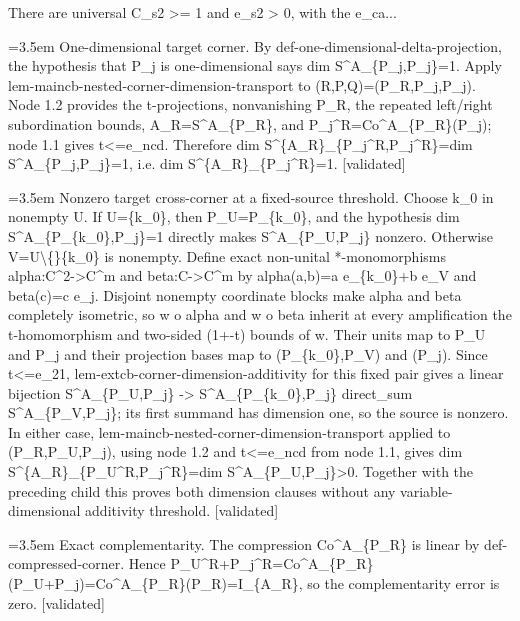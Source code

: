 \documentclass{article}
\newcommand{\step}[1]{\par\noindent\hangindent=3.5em\hangafter=1%
  \makebox[3.5em][l]{\textbf{#1.}}}
\newcommand{\steptag}[1]{\hfill{\small\textsf{[#1]}}}
\begin{document}
\begin{proofbox}{There are universal C\_s2 >= 1 and e\_s2 > 0, with the e\_ca...}
\step{1.5.1} One-dimensional target corner. By def-one-dimensional-delta-projection, the hypothesis that P\_j is one-dimensional says dim S\textasciicircum{}A\_\{P\_j,P\_j\}=1. Apply lem-maincb-nested-corner-dimension-transport to (R,P,Q)=(P\_R,P\_j,P\_j). Node 1.2 provides the t-projections, nonvanishing P\_R, the repeated left/right subordination bounds, A\_R=S\textasciicircum{}A\_\{P\_R\}, and P\_j\textasciicircum{}R=Co\textasciicircum{}A\_\{P\_R\}(P\_j); node 1.1 gives t<=e\_ncd. Therefore dim S\textasciicircum{}\{A\_R\}\_\{P\_j\textasciicircum{}R,P\_j\textasciicircum{}R\}=dim S\textasciicircum{}A\_\{P\_j,P\_j\}=1, i.e. dim S\textasciicircum{}\{A\_R\}\_\{P\_j\textasciicircum{}R\}=1. \steptag{validated} \\[4pt]
\step{1.5.2} Nonzero target cross-corner at a fixed-source threshold. Choose k\_0 in nonempty U. If U=\{k\_0\}, then P\_U=P\_\{k\_0\}, and the hypothesis dim S\textasciicircum{}A\_\{P\_\{k\_0\},P\_j\}=1 directly makes S\textasciicircum{}A\_\{P\_U,P\_j\} nonzero. Otherwise V=U\textbackslash\{\}\{k\_0\} is nonempty. Define exact non-unital *-monomorphisms alpha:C\textasciicircum{}2->C\textasciicircum{}m and beta:C->C\textasciicircum{}m by alpha(a,b)=a e\_\{k\_0\}+b e\_V and beta(c)=c e\_j. Disjoint nonempty coordinate blocks make alpha and beta completely isometric, so w o alpha and w o beta inherit at every amplification the t-homomorphism and two-sided (1+-t) bounds of w. Their units map to P\_U and P\_j and their projection bases map to (P\_\{k\_0\},P\_V) and (P\_j). Since t<=e\_21, lem-extcb-corner-dimension-additivity for this fixed pair gives a linear bijection S\textasciicircum{}A\_\{P\_U,P\_j\} -> S\textasciicircum{}A\_\{P\_\{k\_0\},P\_j\} direct\_sum S\textasciicircum{}A\_\{P\_V,P\_j\}; its first summand has dimension one, so the source is nonzero. In either case, lem-maincb-nested-corner-dimension-transport applied to (P\_R,P\_U,P\_j), using node 1.2 and t<=e\_ncd from node 1.1, gives dim S\textasciicircum{}\{A\_R\}\_\{P\_U\textasciicircum{}R,P\_j\textasciicircum{}R\}=dim S\textasciicircum{}A\_\{P\_U,P\_j\}>0. Together with the preceding child this proves both dimension clauses without any variable-dimensional additivity threshold. \steptag{validated} \\[4pt]
\step{1.6} Exact complementarity. The compression Co\textasciicircum{}A\_\{P\_R\} is linear by def-compressed-corner. Hence P\_U\textasciicircum{}R+P\_j\textasciicircum{}R=Co\textasciicircum{}A\_\{P\_R\}(P\_U+P\_j)=Co\textasciicircum{}A\_\{P\_R\}(P\_R)=I\_\{A\_R\}, so the complementarity error is zero. \steptag{validated} \\[4pt]

\end{proofbox}
\end{document}
